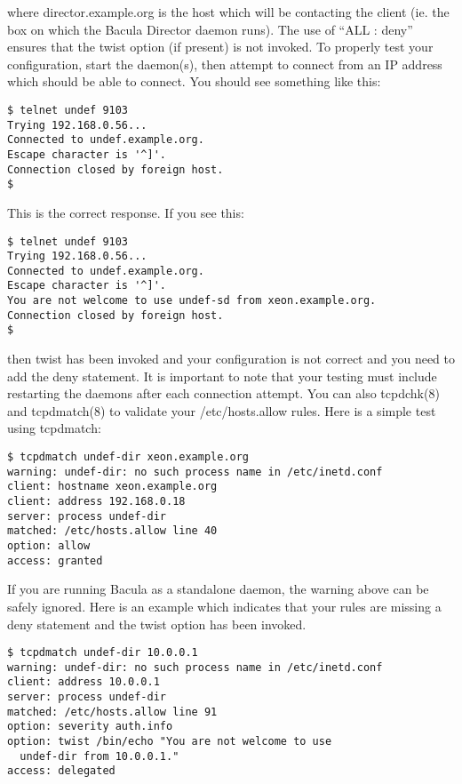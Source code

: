 {where director.example.org is the host which will be contacting the client
(ie. the box on which the Bacula Director daemon runs). The use of ``ALL :
deny'' ensures that the twist option (if present) is not invoked. To properly
test your configuration, start the daemon(s), then attempt to connect from an
IP address which should be able to connect. You should see something like
this: 

\footnotesize
\begin{verbatim}
$ telnet undef 9103
Trying 192.168.0.56...
Connected to undef.example.org.
Escape character is '^]'.
Connection closed by foreign host.
$
\end{verbatim}
\normalsize

This is the correct response. If you see this: 

\footnotesize
\begin{verbatim}
$ telnet undef 9103
Trying 192.168.0.56...
Connected to undef.example.org.
Escape character is '^]'.
You are not welcome to use undef-sd from xeon.example.org.
Connection closed by foreign host.
$
\end{verbatim}
\normalsize

then twist has been invoked and your configuration is not correct and you need
to add the deny statement. It is important to note that your testing must
include restarting the daemons after each connection attempt. You can also
tcpdchk(8) and tcpdmatch(8) to validate your /etc/hosts.allow rules. Here is a
simple test using tcpdmatch: 

\footnotesize
\begin{verbatim}
$ tcpdmatch undef-dir xeon.example.org
warning: undef-dir: no such process name in /etc/inetd.conf
client: hostname xeon.example.org
client: address 192.168.0.18
server: process undef-dir
matched: /etc/hosts.allow line 40
option: allow
access: granted
\end{verbatim}
\normalsize

If you are running Bacula as a standalone daemon, the warning above can be
safely ignored. Here is an example which indicates that your rules are missing
a deny statement and the twist option has been invoked. 

\footnotesize
\begin{verbatim}
$ tcpdmatch undef-dir 10.0.0.1
warning: undef-dir: no such process name in /etc/inetd.conf
client: address 10.0.0.1
server: process undef-dir
matched: /etc/hosts.allow line 91
option: severity auth.info
option: twist /bin/echo "You are not welcome to use
  undef-dir from 10.0.0.1."
access: delegated
\end{verbatim}
\normalsize

}
